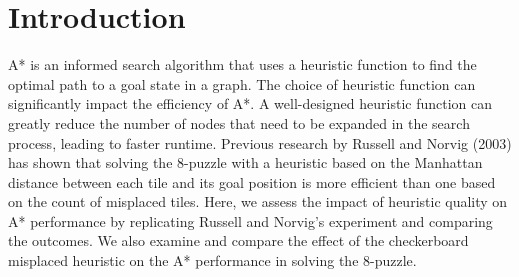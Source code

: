 
\section{Introduction}
\label{sec:intro}

A* is an informed search algorithm that uses a heuristic function to find the optimal path to a goal state in a graph. The choice of heuristic function can significantly impact the efficiency of A*. A well-designed heuristic function can greatly reduce the number of nodes that need to be expanded in the search process, leading to faster runtime. Previous research by Russell and Norvig (2003) has shown that solving the 8-puzzle with a heuristic based on the Manhattan distance between each tile and its goal position is more efficient than one based on the count of misplaced tiles. Here, we assess the impact of heuristic quality on A* performance by replicating Russell and Norvig’s experiment and comparing the outcomes. We also examine and compare the effect of the checkerboard misplaced heuristic on the A* performance in solving the 8-puzzle.
